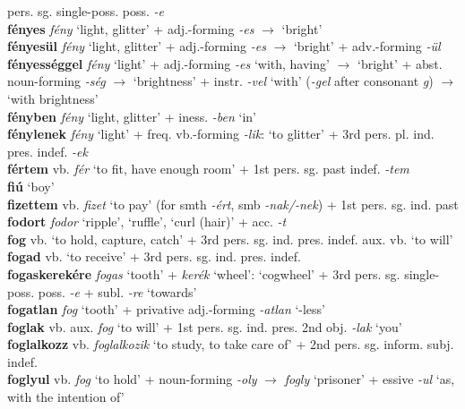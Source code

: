 \documentclass[11pt]{article}
\begin{document}
pers. sg. single\hyp{}poss. poss. \emph{-e} \\
\textbf{fényes} \emph{fény} `light, glitter' + adj.\hyp{}forming \emph{-es}
$\rightarrow$ `bright' \\
\textbf{fényesül} \emph{fény} `light, glitter' + adj.\hyp{}forming \emph{-es}
$\rightarrow$ `bright' + adv.\hyp{}forming \emph{-ül} \\
\textbf{fényességgel} \emph{fény} `light' + adj.\hyp{}forming \emph{-es}
    `with, having' $\rightarrow$ `bright' + abst. noun\hyp{}forming
  \emph{-ség} $\rightarrow$ `brightness' +
  instr. \emph{-vel} `with' (\emph{-gel} after consonant
  \emph{g}) $\rightarrow$ `with brightness' \\
\textbf{fényben} \emph{fény} `light, glitter' + iness. \emph{-ben}
`in' \\
\textbf{fénylenek} \emph{fény} `light' +
freq. vb.\hyp{}forming \emph{-lik}: `to glitter' + 3rd
pers. pl. ind. pres. indef. \emph{-ek} \\
\textbf{fértem} vb. \emph{fér} `to fit, have enough room' + 1st
pers. sg. past indef. \emph{-tem} \\
\textbf{fiú} `boy' \\
\textbf{fizettem} vb. \emph{fizet} `to pay' (for smth \emph{-ért},
smb \emph{-nak/-nek}) + 1st pers. sg. ind. past \\
\textbf{fodort} \emph{fodor} `ripple', `ruffle', `curl (hair)' +
acc. \emph{-t} \\
\textbf{fog} vb. `to hold, capture, catch' + 3rd
pers. sg. ind. pres. indef. \textbar\textbar{} aux. vb. `to will' \\
\textbf{fogad} vb. `to receive' + 3rd pers. sg. ind. pres. indef. \\
\textbf{fogaskerekére} \emph{fogas} `tooth' + \emph{kerék} `wheel':
`cogwheel' + 3rd pers. sg. single\hyp{}poss. poss. \emph{-e} + subl. \emph{-re}
`towards' \\
\textbf{fogatlan} \emph{fog} `tooth' +
privative adj.\hyp{}forming \emph{-atlan} `-less' \\
\textbf{foglak} vb. aux. \emph{fog} `to will' + 1st
pers. sg. ind. pres. 2nd obj. \emph{-lak} `you' \\
\textbf{foglalkozz} vb. \emph{foglalkozik} `to study, to take care
of' + 2nd pers. sg. inform. subj. indef. \\
\textbf{foglyul} vb. \emph{fog} `to hold' + noun\hyp{}forming \emph{-oly} $\rightarrow$ \emph{fogly} `prisoner' + essive
  \emph{-ul} `as, with the intention of' \\
\end{document}
